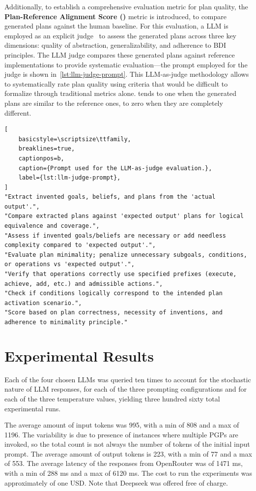 \documentclass[12pt,a4paper,openright,twoside]{book}
\begin{document}
Additionally, to establish a comprehensive evaluation metric for plan quality, the \textbf{Plan-Reference Alignment Score (\PRAS{})} metric is introduced, to compare generated plans against the human baseline.
%
For this evaluation, a \ac{LLM} is employed as an explicit judge~\cite{DBLP:journals/corr/abs-2412-05579} to assess the generated plans across three key dimensions: quality of abstraction, generalizability, and adherence to BDI principles. 
%
The \ac{LLM} judge compares these generated plans against reference implementations to provide systematic evaluation---the prompt employed for the judge is shown in~\cref{lst:llm-judge-prompt}.
%
This \ac{LLM}-as-judge methodology allows to systematically rate plan quality using criteria that would be difficult to formalize through traditional metrics alone.
%
\PRAS{} tends to one when the generated plans are similar to the reference ones, to zero when they are completely different.

\begin{lstlisting}[
    basicstyle=\scriptsize\ttfamily,
    breaklines=true,
    captionpos=b,
    caption={Prompt used for the LLM-as-judge evaluation.},
    label={lst:llm-judge-prompt},
]
"Extract invented goals, beliefs, and plans from the 'actual output'.",
"Compare extracted plans against 'expected output' plans for logical equivalence and coverage.",
"Assess if invented goals/beliefs are necessary or add needless complexity compared to 'expected output'.",
"Evaluate plan minimality; penalize unnecessary subgoals, conditions, or operations vs 'expected output'.",
"Verify that operations correctly use specified prefixes (execute, achieve, add, etc.) and admissible actions.",
"Check if conditions logically correspond to the intended plan activation scenario.",
"Score based on plan correctness, necessity of inventions, and adherence to minimality principle."
\end{lstlisting}

\section{Experimental Results}\label{sec:exp-results}

Each of the four chosen \acp{LLM} was queried ten times to account for the stochastic nature of \ac{LLM} responses, for each of the three prompting configurations and for each of the three temperature values, yielding three hundred sixty total experimental runs.

The average amount of input tokens was 995, with a min of 808 and a max of 1196.
%
The variability is due to presence of instances where multiple \acp{PGP} are invoked, so the total count is not always the number of tokens of the initial input prompt.
%
The average amount of output tokens is 223, with a min of 77 and a max of 553.
%
The average latency of the responses from OpenRouter was of 1471 ms, with a min of 288 ms and a max of 6120 ms.
%
The cost to run the experiments was approximately of one USD.
%
Note that Deepseek was offered free of charge.
\end{document}
